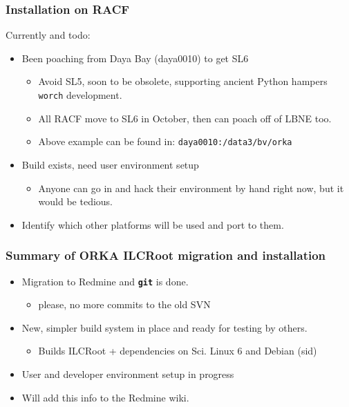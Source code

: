 \documentclass[xcolor=dvipsnames]{beamer}
\newcommand{\git}{\texttt{\textbf{git}}\xspace}
\begin{document}
\begin{frame}[fragile]
  \frametitle{Installation on RACF}

  Currently and todo:

  \begin{itemize}
  \item Been poaching from Daya Bay (daya0010) to get SL6
    \begin{itemize}
    \item Avoid SL5, soon to be obsolete, supporting ancient Python hampers \verb|worch| development.
    \item All RACF move to SL6 in October, then can poach off of LBNE too.
    \item Above example can be found in: \verb|daya0010:/data3/bv/orka|
    \end{itemize}
  \item Build exists, need user environment setup
    \begin{itemize}
    \item Anyone can go in and hack their environment by hand right
      now, but it would be tedious.
    \end{itemize}
  \item Identify which other platforms will be used and port to them.
  \end{itemize}
\end{frame}


\begin{frame}
  \frametitle{Summary of ORKA ILCRoot migration and installation}
  \begin{itemize}
  \item Migration to Redmine and \git is done.
    \begin{itemize}
    \item please, no more commits to the old SVN
    \end{itemize}
  \item New, simpler build system in place and ready for testing by others.
    \begin{itemize}
    \item Builds ILCRoot + dependencies on Sci. Linux 6 and Debian (sid)
    \end{itemize}
  \item User and developer environment setup in progress
  \item Will add this info to the Redmine wiki.
  \end{itemize}
\end{frame}
\end{document}
